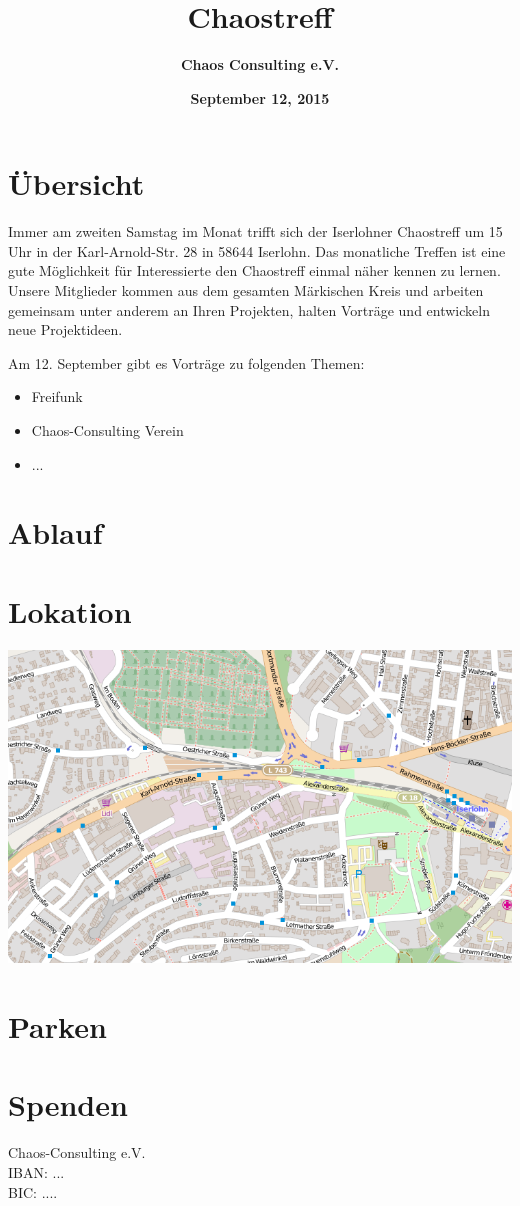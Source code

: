 \documentclass[10pt,foldmark,tumble]{leaflet}
\title{\bf Chaostreff}
\author{\Large \bf Chaos Consulting e.V.}
\date{\bf September 12, 2015 }
\begin{document}
\maketitle
\section{Übersicht}
Immer am zweiten Samstag im Monat trifft sich der Iserlohner Chaostreff um 15 Uhr in der Karl-Arnold-Str. 28 in 58644 Iserlohn. Das monatliche Treffen ist eine gute Möglichkeit für Interessierte den Chaostreff einmal näher kennen zu lernen. Unsere Mitglieder kommen aus dem gesamten Märkischen Kreis und arbeiten gemeinsam unter anderem an Ihren Projekten, halten Vorträge und entwickeln neue Projektideen.

Am 12. September gibt es Vorträge zu folgenden Themen:
\begin{itemize}
\item Freifunk
\item Chaos-Consulting Verein
\item ...
\end{itemize}

\blindtext

\section{Ablauf}
\blindtext

\section{Lokation}
\includegraphics[scale=0.3]{map.png}
\blindtext

\section{Parken}
\blindtext

\blindtext

\blindtext

\blindtext

\blindtext

\blindtext

\blindtext

\hfill
\section{Spenden}
Chaos-Consulting e.V.\\
IBAN: ...\\
BIC: ....\\
\end{document}

